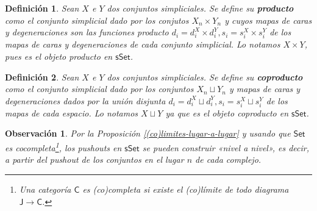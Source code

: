\documentclass[11pt]{report}
\theoremstyle{colored}
\newtheorem{definition}{Definición}[section]
\newtheorem{remark}{Observación}[section]
\newcommand{\cat}[1]{\mathsf{#1}}
\newcommand{\guill}[1]{«#1»}
\begin{document}
\begin{definition} Sean $X$ e $Y$ dos conjuntos simpliciales. Se define su \textbf{producto} como el conjunto simplicial dado por los conjutos $X_n \times Y_n$ y cuyos mapas de caras y degeneraciones son las funciones producto $d_i = d_i^X \times d_i^Y, s_i = s_i^X \times s_i^Y$ de los mapas de caras y degeneraciones de cada conjunto simplicial. Lo notamos $X \times Y$, pues es el objeto producto en $\cat{sSet}$.
\end{definition}

\begin{definition} Sean $X$ e $Y$ dos conjuntos simpliciales. Se define su \textbf{coproducto} como el conjunto simplicial dado por los conjuntos $X_n \sqcup Y_n$ y mapas de caras y degeneraciones dados por la unión disjunta $d_i = d_i^X \sqcup d_i^Y, s_i = s_i^X \sqcup s_i^Y$ de los mapas de cada espacio. Lo notamos $X \sqcup Y$ ya que es el objeto coproducto en $\cat{sSet}$.
\end{definition}

\begin{remark} Por la Proposición \ref{(co)limites-lugar-a-lugar} y usando que $\cat{Set}$ es cocompleta\footnote{Una categoría $\cat{C}$ es (co)completa si existe el (co)límite de todo diagrama $\cat{J} \to \cat{C}$.}, los pushouts en $\cat{sSet}$ se pueden construir \guill{nivel a nivel}, es decir, a partir del pushout de los conjuntos en el lugar $n$ de cada complejo.
\end{remark}
\end{document}
